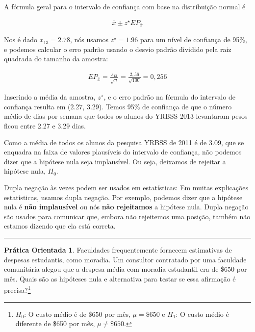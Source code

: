 \documentclass[
]{book}
\theoremstyle{definition}
\theoremstyle{definition}
\theoremstyle{definition}
\newtheorem{exercise}{Prática Orientada}[chapter]
\theoremstyle{definition}
\theoremstyle{remark}
\begin{document}
A fórmula geral para o intervalo de confiança com base na distribuição normal é

\begin{align*}
\bar{x} \pm z^{\star} EP_{\bar{x}}
\end{align*}

Nos é dado \(\bar{x}_{13} = 2.78\), nós usamos \(z^{\star} = 1.96\) para um nível de confiança de 95\%, e podemos calcular o erro padrão usando o desvio padrão dividido pela raiz quadrada do tamanho da amostra:

\begin{align*}
EP_{\bar{x}} = \frac{s_{13}}{\sqrt{n}} = \frac{2,56}{\sqrt{100}} = 0,256
\end{align*}

Inserindo a média da amostra, \(z^{\star}\), e o erro padrão na fórmula do intervalo de confiança resulta em (2.27, 3.29). Temos 95\% de confiança de que o número médio de dias por semana que todos os alunos do YRBSS 2013 levantaram pesos ficou entre 2.27 e 3.29 dias.

Como a média de todos os alunos da pesquisa YRBSS de 2011 é de 3.09, que se enquadra na faixa de valores plausíveis do intervalo de confiança, não podemos dizer que a hipótese nula seja implausível. Ou seja, deixamos de rejeitar a hipótese nula, \(H_0\).

Dupla negação às vezes podem ser usados em estatísticas: Em muitas explicações estatísticas, usamos dupla negação. Por exemplo, podemos dizer que a hipótese nula é \textbf{não implausível} ou nós \textbf{não rejeitamos} a hipótese nula. Dupla negação são usados para comunicar que, embora não rejeitemos uma posição, também não estamos dizendo que ela está correta.

\begin{center}\rule{0.5\linewidth}{0.5pt}\end{center}

\begin{exercise}
\protect\hypertarget{exr:unnamed-chunk-161}{}{\label{exr:unnamed-chunk-161} }Faculdades frequentemente fornecem estimativas de despesas estudantis, como moradia. Um consultor contratado por uma faculdade comunitária alegou que a despesa média com moradia estudantil era de \$650 por mês. Quais são as hipóteses nula e alternativa para testar se essa afirmação é precisa?\footnote{\(H_0\): O custo médio é de \$650 por mês, \(\mu = \$650\) e \(H_1\): O custo médio é diferente de \$650 por mês, \(\mu \neq \$650\).}
\end{exercise}
\end{document}
